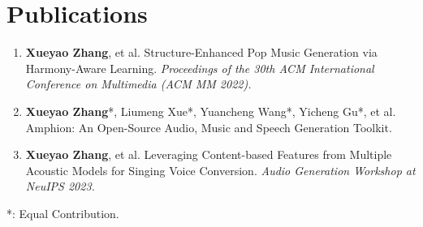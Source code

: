 \documentclass{resume}
\begin{document}




\section{Publications}

\begin{enumerate}\itemsep 0.5em
  \item \textbf{Xueyao Zhang}, et al. Structure-Enhanced Pop Music Generation via Harmony-Aware Learning. \textit{Proceedings of the 30th ACM International Conference on Multimedia (ACM MM 2022).}
  \item \textbf{Xueyao Zhang}*, Liumeng Xue*, Yuancheng Wang*, Yicheng Gu*, et al. Amphion: An Open-Source Audio, Music and Speech Generation Toolkit.
  \item \textbf{Xueyao Zhang}, et al. Leveraging Content-based Features from Multiple Acoustic Models for Singing Voice Conversion. \textit{Audio Generation Workshop at NeuIPS 2023.}
\end{enumerate}
*: Equal Contribution.
\end{document}
